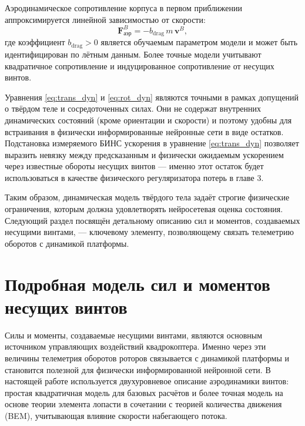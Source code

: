 Аэродинамическое сопротивление корпуса в первом приближении аппроксимируется линейной зависимостью от скорости:
\begin{equation}
	\mathbf{F}_\text{аэр}^B = -b_{\mathrm{drag}} \, m \, \mathbf{v}^B,
	\label{eq:drag}
\end{equation}
где коэффициент \(b_{\mathrm{drag}} > 0\) является обучаемым параметром модели и может быть идентифицирован по лётным данным. Более точные модели учитывают квадратичное сопротивление и индуцированное сопротивление от несущих винтов.

Уравнения \eqref{eq:trans_dyn} и \eqref{eq:rot_dyn} являются точными в рамках допущений о твёрдом теле и сосредоточенных силах. Они не содержат внутренних динамических состояний (кроме ориентации и скорости) и поэтому удобны для встраивания в физически информированные нейронные сети в виде остатков. Подстановка измеряемого БИНС ускорения в уравнение \eqref{eq:trans_dyn} позволяет выразить невязку между предсказанным и физически ожидаемым ускорением через известные обороты несущих винтов — именно этот остаток будет использоваться в качестве физического регуляризатора потерь в главе 3.

Таким образом, динамическая модель твёрдого тела задаёт строгие физические ограничения, которым должна удовлетворять нейросетевая оценка состояния. Следующий раздел посвящён детальному описанию сил и моментов, создаваемых несущими винтами, — ключевому элементу, позволяющему связать телеметрию оборотов с динамикой платформы.


\section{Подробная модель сил и моментов несущих винтов}
\label{sec:propeller_model}

Силы и моменты, создаваемые несущими винтами, являются основным источником управляющих воздействий квадрокоптера. Именно через эти величины телеметрия оборотов роторов связывается с динамикой платформы и становится полезной для физически информированной нейронной сети. В настоящей работе используется двухуровневое описание аэродинамики винтов: простая квадратичная модель для базовых расчётов и более точная модель на основе теории элемента лопасти в сочетании с теорией количества движения (BEM), учитывающая влияние скорости набегающего потока.

